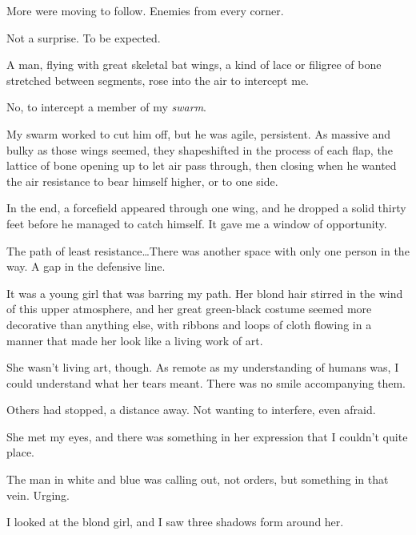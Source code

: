 More were moving to follow.  Enemies from every corner.



Not a surprise.  To be expected.



A man, flying with great skeletal bat wings, a kind of lace or filigree of bone stretched between segments, rose into the air to intercept me.



No, to intercept a member of my \emph{swarm}.



My swarm worked to cut him off, but he was agile, persistent.  As massive and bulky as those wings seemed, they shapeshifted in the process of each flap, the lattice of bone opening up to let air pass through, then closing when he wanted the air resistance to bear himself higher, or to one side.



In the end, a forcefield appeared through one wing, and he dropped a solid thirty feet before he managed to catch himself.  It gave me a window of opportunity.



The path of least resistance\ldots  There was another space with only one person in the way.  A gap in the defensive line.



It was a young girl that was barring my path.  Her blond hair stirred in the wind of this upper atmosphere, and her great green-black costume seemed more decorative than anything else, with ribbons and loops of cloth flowing in a manner that made her look like a living work of art.



She wasn't living art, though.  As remote as my understanding of humans was, I could understand what her tears meant.  There was no smile accompanying them.



Others had stopped, a distance away.  Not wanting to interfere, even afraid.



She met my eyes, and there was something in her expression that I couldn't quite place.



The man in white and blue was calling out, not orders, but something in that vein.  Urging.



I looked at the blond girl, and I saw three shadows form around her.



